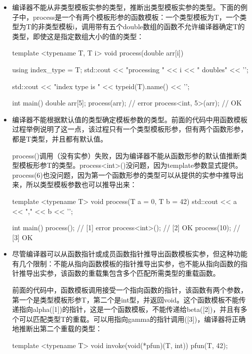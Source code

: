 \begin{itemize}
\item
编译器不能从非类型模板实参的类型，推断出类型模板实参的类型。下面的例子中，process是一个有两个模板形参的函数模板：一个类型模板为T，一个类型为T的非类型模板i，调用带有五个double数组的函数不允许编译器确定T的类型，即使这是指定数组大小的值的类型：

\begin{cpp}
template <typename T, T i>
void process(double arr[i])
{
	using index_type = T;
	std::cout << "processing " << i
	          << " doubles" << '\n';
	          
	std::cout << "index type is "
              << typeid(T).name() << '\n';
}

int main()
{
	double arr[5]{};
	process(arr); // error
	process<int, 5>(arr); // OK
}
\end{cpp}

\item
编译器不能根据默认值的类型确定模板参数的类型。前面的代码中用函数模板过程举例说明了这一点，该过程只有一个类型模板形参，但有两个函数形参，都是T类型，并且都有默认值。

process()调用（没有实参）失败，因为编译器不能从函数形参的默认值推断类型模板形参T的类型。process<int>()没问题，因为template参数显式提供。process(6)也没问题，因为第一个函数形参的类型可以从提供的实参中推导出来，所以类型模板参数也可以推导出来：

\begin{cpp}
template <typename T>
void process(T a = 0, T b = 42)
{
	std::cout << a << "," << b << '\n';
}

int main()
{
	process(); // [1] error
	process<int>(); // [2] OK
	process(10); // [3] OK
}
\end{cpp}

\item
尽管编译器可以从函数指针或成员函数指针推导出函数模板实参，但这种功能有几个限制：不能从指向函数模板的指针推导出实参，也不能从指向函数的指针推导出实参，该函数的重载集包含多个匹配所需类型的重载函数。

前面的代码中，函数模板调用接受一个指向函数的指针，该函数有两个参数，第一个是类型模板形参T，第二个是int型，并返回void。这个函数模板不能传递指向alpha([1])的指针，这是一个函数模板，不能传递给beta([2])，并且有多个可以匹配类型T的重载。可以用指向gamma的指针调用([3])，编译器将正确地推断出第二个重载的类型：

\begin{cpp}
template <typename T>
void invoke(void(*pfun)(T, int))
{
	pfun(T{}, 42);
}


\end{cpp}
\end{itemize}
